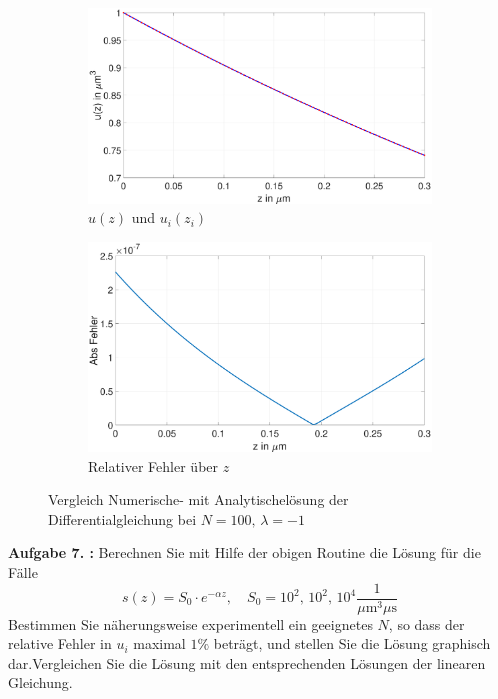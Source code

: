  \begin{figure}[h]
	\begin{subfigure}[b]{0.5\textwidth}
		\includegraphics[width=\textwidth]{figures/station_gl_2_2/test_n100_l1}
		\caption{$u(z)$ und $u_{i}(z_i)$}
	\end{subfigure}
	\hfill
	\begin{subfigure}[b]{0.5\textwidth}
		\includegraphics[width=1\linewidth]{figures/station_gl_2_2/test_n100_l1_fehler}
		\caption{Relativer Fehler über $z$}
	\end{subfigure}
	\caption{Vergleich Numerische- mit Analytischelösung der Differentialgleichung bei $N=100,\,\lambda=-1$}
\end{figure}
\begin{mybox}
	\textbf{Aufgabe 7. :}	Berechnen Sie mit Hilfe der obigen Routine die
	Lösung für die Fälle
	\begin{equation}
		s(z)=S_0\cdot e^{-\alpha z}, \quad S_0=10^2, \, 10^2, \, 10^4
		\frac{1}{\si{\mu\meter^3 \mu \s}}
	\end{equation}
	Bestimmen Sie näherungsweise experimentell ein geeignetes $N$, so dass
	der relative Fehler in $u_i$
	maximal $1\%$ beträgt, und stellen Sie die Lösung graphisch
	dar.Vergleichen Sie die Lösung mit den
	entsprechenden Lösungen der linearen Gleichung.
\end{mybox}

